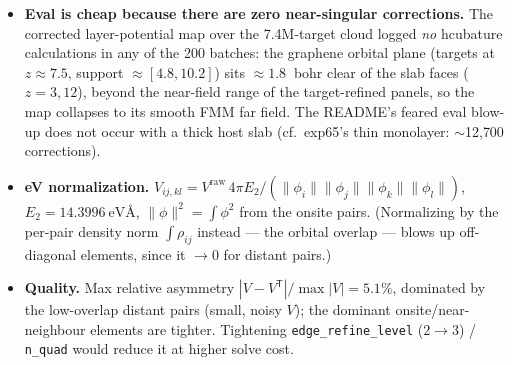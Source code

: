 \documentclass[11pt]{article}
\begin{document}
\begin{itemize}
\item \textbf{Eval is cheap because there are zero near-singular corrections.} The
      corrected layer-potential map over the \num{7.4}M-target cloud logged
      \emph{no} hcubature calculations in any of the 200 batches: the graphene
      orbital plane (targets at $z\approx7.5$, support $\approx[4.8,10.2]$) sits
      $\approx\SI{1.8}{}$ bohr clear of the slab faces ($z=3,12$), beyond the
      near-field range of the target-refined panels, so the map collapses to its
      smooth FMM far field. The README's feared eval blow-up does not occur with a
      thick host slab (cf.\ exp65's thin monolayer: $\sim$12{,}700 corrections).
\item \textbf{eV normalization.} $V_{ij,kl} = V^{\mathrm{raw}}\,4\pi E_2/(\lVert\phi_i\rVert
      \lVert\phi_j\rVert\lVert\phi_k\rVert\lVert\phi_l\rVert)$, $E_2=\SI{14.3996}{\electronvolt\angstrom}$,
      $\lVert\phi\rVert^2=\int\phi^2$ from the onsite pairs. (Normalizing by the
      per-pair density norm $\int\rho_{ij}$ instead --- the orbital overlap --- blows
      up off-diagonal elements, since it $\to0$ for distant pairs.)
\item \textbf{Quality.} Max relative asymmetry $|V-V^{\mathsf T}|/\max|V| = 5.1\%$,
      dominated by the low-overlap distant pairs (small, noisy $V$); the dominant
      onsite/near-neighbour elements are tighter. Tightening \texttt{edge\_refine\_level}
      ($2\to3$) / \texttt{n\_quad} would reduce it at higher solve cost.
\end{itemize}
\end{document}
